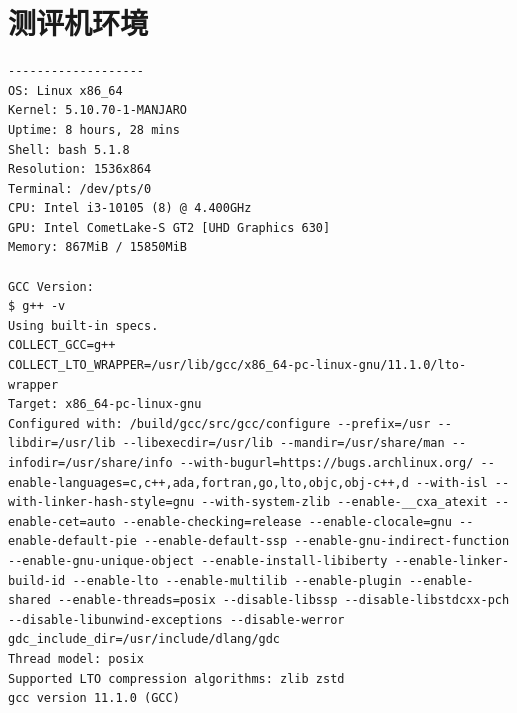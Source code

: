 \documentclass{cjc}
\begin{document}
\newpage

\appendix

\section{测评机环境}

\begin{lstlisting}[breaklines]
-------------------
OS: Linux x86_64
Kernel: 5.10.70-1-MANJARO
Uptime: 8 hours, 28 mins
Shell: bash 5.1.8
Resolution: 1536x864
Terminal: /dev/pts/0
CPU: Intel i3-10105 (8) @ 4.400GHz
GPU: Intel CometLake-S GT2 [UHD Graphics 630]
Memory: 867MiB / 15850MiB

GCC Version:
$ g++ -v
Using built-in specs.
COLLECT_GCC=g++
COLLECT_LTO_WRAPPER=/usr/lib/gcc/x86_64-pc-linux-gnu/11.1.0/lto-wrapper
Target: x86_64-pc-linux-gnu
Configured with: /build/gcc/src/gcc/configure --prefix=/usr --libdir=/usr/lib --libexecdir=/usr/lib --mandir=/usr/share/man --infodir=/usr/share/info --with-bugurl=https://bugs.archlinux.org/ --enable-languages=c,c++,ada,fortran,go,lto,objc,obj-c++,d --with-isl --with-linker-hash-style=gnu --with-system-zlib --enable-__cxa_atexit --enable-cet=auto --enable-checking=release --enable-clocale=gnu --enable-default-pie --enable-default-ssp --enable-gnu-indirect-function --enable-gnu-unique-object --enable-install-libiberty --enable-linker-build-id --enable-lto --enable-multilib --enable-plugin --enable-shared --enable-threads=posix --disable-libssp --disable-libstdcxx-pch --disable-libunwind-exceptions --disable-werror gdc_include_dir=/usr/include/dlang/gdc
Thread model: posix
Supported LTO compression algorithms: zlib zstd
gcc version 11.1.0 (GCC)

\end{lstlisting}
\end{document}
